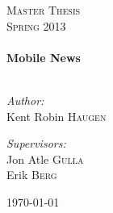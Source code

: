 \begin{titlepage}

\begin{center}



\textsc{\LARGE Master Thesis}\\[1.5cm]

\textsc{\Large Spring 2013}\\[0.5cm]


\HRule \\[0.4cm]
{ \huge \bfseries Mobile News}\\[0.4cm]

\HRule \\[1.5cm]

\begin{minipage}{0.4\textwidth}
\begin{flushleft} \large
\emph{Author:}\\
Kent Robin \textsc{Haugen}
\end{flushleft}
\end{minipage}
\begin{minipage}{0.4\textwidth}
\begin{flushright} \large
\emph{Supervisors:} \\
Jon Atle \textsc{Gulla} \\
Erik \textsc{Berg}
\end{flushright}
\end{minipage}

\vfill

{\large \today}

\end{center}

\end{titlepage}